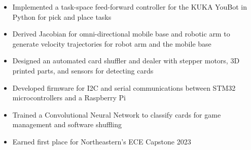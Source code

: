 \documentclass[10pt,a4paper,ragged2e,withhyper]{altacv}
\begin{document}
    \begin{itemize}
        \item Implemented a task-space feed-forward controller for the KUKA YouBot in Python for pick and place tasks
        \item Derived Jacobian for omni-directional mobile base and robotic arm to generate velocity trajectories for robot arm and the mobile base
    \end{itemize}
    \begin{itemize}
        \item Designed an automated card shuffler and dealer with stepper motors, 3D printed parts, and sensors for detecting cards
        \item Developed firmware for I2C and serial communications between STM32 microcontrollers and a Raspberry Pi
        \item Trained a Convolutional Neural Network to classify cards for game management and software shuffling
        \item Earned first place for Northeastern's ECE Capstone 2023
    \end{itemize}
\end{document}
